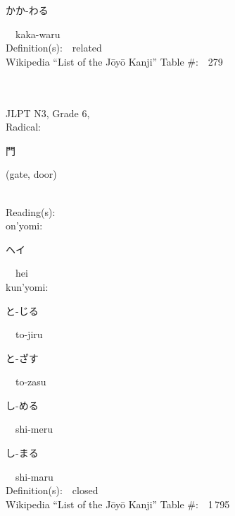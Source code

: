 \begin{multicols}{2}
{\hspace*{2em}}{\begin{CJK}{UTF8}{min} かか-わる \end{CJK}}\ \ kaka-waru\ \ \\
Definition(s):\ \ related \\
Wikipedia ``List of the J\=oy\=o Kanji'' Table \#:\ \ 279 \\
\ \ \\
{\fontsize{34pt}{40pt}  }\ \ \\  %
{JLPT N3, Grade 6, \\Radical:\ \ {\begin{CJK}{UTF8}{min} 門 \end{CJK}} (gate, door) } \\
Reading(s):\ \ \\
{\hspace*{1em}}on'yomi:\ \ \\
{\hspace*{2em}}{\begin{CJK}{UTF8}{min} ヘイ \end{CJK}}\ \ hei\ \ \\
{\hspace*{1em}}kun'yomi:\ \ \\
{\hspace*{2em}}{\begin{CJK}{UTF8}{min} と-じる \end{CJK}}\ \ to-jiru\ \ \\
{\hspace*{2em}}{\begin{CJK}{UTF8}{min} と-ざす \end{CJK}}\ \ to-zasu\ \ \\
{\hspace*{2em}}{\begin{CJK}{UTF8}{min} し-める \end{CJK}}\ \ shi-meru\ \ \\
{\hspace*{2em}}{\begin{CJK}{UTF8}{min} し-まる \end{CJK}}\ \ shi-maru\ \ \\
Definition(s):\ \ closed \\
Wikipedia ``List of the J\=oy\=o Kanji'' Table \#:\ \ 1\,795 \\
\ \ \\

\end{multicols}
